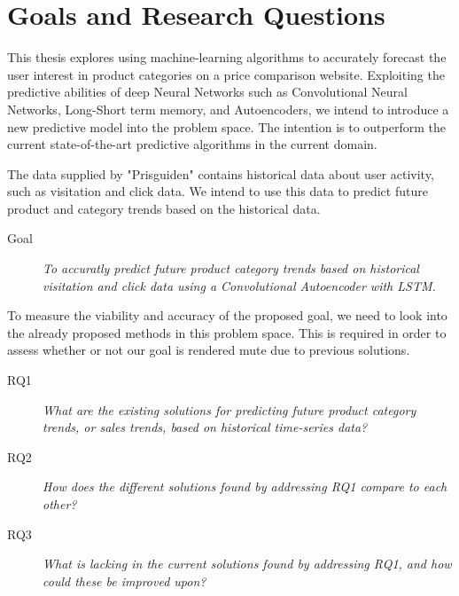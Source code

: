 \section{Goals and Research Questions}
\label{section:Introduction:Goal}


This thesis explores using machine-learning algorithms to accurately forecast the user interest in product categories on a price comparison website.
Exploiting the predictive abilities of deep Neural Networks such as Convolutional Neural Networks, Long-Short term memory, and Autoencoders,
we intend to introduce a new predictive model into the problem space.
The intention is to outperform the current state-of-the-art predictive algorithms in the current domain.

The data supplied by "Prisguiden" contains historical data about user activity, such as visitation and click data.
We intend to use this data to predict future product and category trends based on the historical data.

\begin{description}
  \item[Goal]{\it To accuratly predict future product category trends based on historical visitation and click data using a Convolutional Autoencoder with LSTM.}
\end{description}

To measure the viability and accuracy of the proposed goal, we need to look into the already proposed methods in this problem space.
This is required in order to assess whether or not our goal is rendered mute due to previous solutions.

\begin{description}
  \item[RQ1]{\it What are the existing solutions for predicting future product category trends, or sales trends, based on historical time-series data?}
\end{description}

\begin{description}
  \item[RQ2]{\it How does the different solutions found by addressing RQ1 compare to each other?}
\end{description}

\begin{description}
  \item[RQ3]{\it What is lacking in the current solutions found by addressing RQ1, and how could these be improved upon?}
\end{description}

